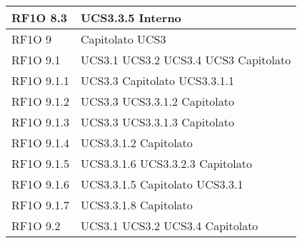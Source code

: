 \begin{center}
\begin{longtable}{ | p{5cm} | p{5cm} |}
        RF1O 8.3 &  UCS3.3.5 \newline  Interno \newline  \\ \hline      
        RF1O 9  &  Capitolato \newline  UCS3 \newline  \\ \hline      
        RF1O 9.1  &  UCS3.1 \newline  UCS3.2 \newline  UCS3.4 \newline  UCS3 \newline  Capitolato \newline  \\ \hline      
        RF1O 9.1.1  &  UCS3.3 \newline  Capitolato \newline  UCS3.3.1.1 \newline  \\ \hline      
        RF1O 9.1.2  &  UCS3.3 \newline  UCS3.3.1.2 \newline  Capitolato \newline  \\ \hline      
        RF1O 9.1.3  &  UCS3.3 \newline  UCS3.3.1.3 \newline  Capitolato \newline  \\ \hline      
        RF1O 9.1.4  &  UCS3.3.1.2 \newline  Capitolato \newline  \\ \hline      
        RF1O 9.1.5 &  UCS3.3.1.6 \newline  UCS3.3.2.3 \newline  Capitolato \newline  \\ \hline      
        RF1O 9.1.6 &  UCS3.3.1.5 \newline  Capitolato \newline  UCS3.3.1 \newline  \\ \hline      
        RF1O 9.1.7 &  UCS3.3.1.8 \newline  Capitolato \newline  \\ \hline      
        RF1O 9.2 &  UCS3.1 \newline  UCS3.2 \newline  UCS3.4 \newline  Capitolato \newline  \\ \hline      

\end{longtable}
\end{center}
